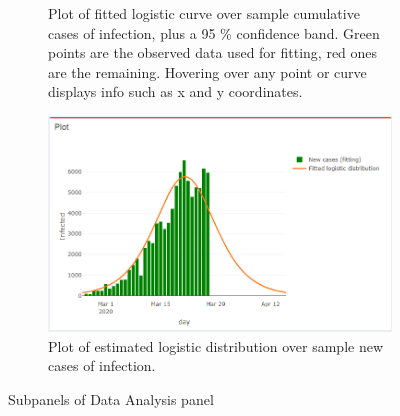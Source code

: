 \documentclass[
12pt, %
a4paper, %
oneside, %
headinclude,footinclude, %
BCOR5mm, %
]{scrartcl}
\begin{document}
\begin{figure}[H]
\begin{subfigure}{0.6\textwidth}
  \caption{ Plot of fitted logistic curve over sample cumulative cases of infection, plus a 95 \% confidence band. Green points are the observed data used for fitting, red ones are the remaining. Hovering over any point or curve displays info such as x and y coordinates.}
  \label{fig:logistic_plot1}
\end{subfigure} 
\hspace{5.5cm}
\begin{subfigure}{0.6\textwidth}
  \includegraphics[width=1\linewidth]{Figures/logistic_plot2.png} 
  \caption{Plot of estimated logistic distribution over sample new cases of infection.}
  \label{fig:logistic_plot2}
\end{subfigure}
\label{fig:logistic_plots_set}
\caption{Subpanels of Data Analysis panel }
\end{figure}
\end{document}
